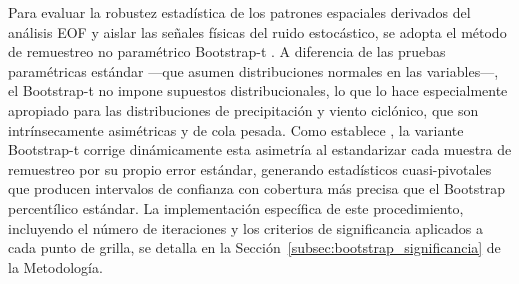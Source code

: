 Para evaluar la robustez estadística de los patrones espaciales derivados del análisis EOF y aislar las señales físicas del ruido estocástico, se adopta el método de remuestreo no paramétrico Bootstrap-t \citep{efron1993introduction}. A diferencia de las pruebas paramétricas estándar —que asumen distribuciones normales en las variables—, el Bootstrap-t no impone supuestos distribucionales, lo que lo hace especialmente apropiado para las distribuciones de precipitación y viento ciclónico, que son intrínsecamente asimétricas y de cola pesada. Como establece \citet{hesterberg2015bootstrap}, la variante Bootstrap-t corrige dinámicamente esta asimetría al estandarizar cada muestra de remuestreo por su propio error estándar, generando estadísticos cuasi-pivotales que producen intervalos de confianza con cobertura más precisa que el Bootstrap percentílico estándar. La implementación específica de este procedimiento, incluyendo el número de iteraciones y los criterios de significancia aplicados a cada punto de grilla, se detalla en la Sección~\ref{subsec:bootstrap_significancia} de la Metodología.